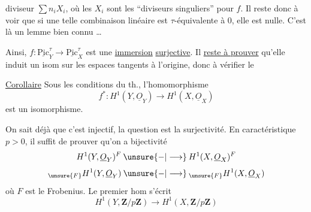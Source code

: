 diviseur $\sum n_iX_i$, où les $X_i$ sont les ``diviseurs singuliers''
pour $f$. Il reste donc à voir que si une telle combinaison linéaire est
$\tau$-équivalente à $0$, elle est nulle.
C'est là un lemme bien connu \ldots


Ainsi, $f:\underline{\mathrm{Pic}}_Y^\tau\longrightarrow
\underline{\mathrm{Pic}}_X^\tau$ est une \uline{immersion}
\uline{surjective}.
Il \uline{reste à prouver} qu'elle induit un isom sur les espaces tangents
à l'origine, donc à vérifier le

\uline{Corollaire} Sous les conditions du th., l'homomorphisme
\[
f^*:H^1(Y,\underline O_Y)\longrightarrow H^1(X,\underline O_X)
\]
est un isomorphisme.

On sait déjà que c'est injectif, la question est la surjectivité.
En caractéristique $p>0$, il suffit de prouver qu'on a bijectivité
\[
H^1(Y,\underline O_Y)^F
\mathbin{\unsure{-|\longrightarrow}}
H^1(X,\underline O_X)^F
\]
\[
{}_{\unsure{F}}H^1(Y,\underline O_Y)
\mathbin{\unsure{-|\longrightarrow}}
{}_{\unsure{F}}H^1(X,\underline O_X)
\]
où $F$ est le Frobenius.
Le premier hom s'écrit
\[
H^1(Y,\mathbf Z/p\mathbf Z)\longrightarrow H^1(X,\mathbf Z/p\mathbf Z)
\]
